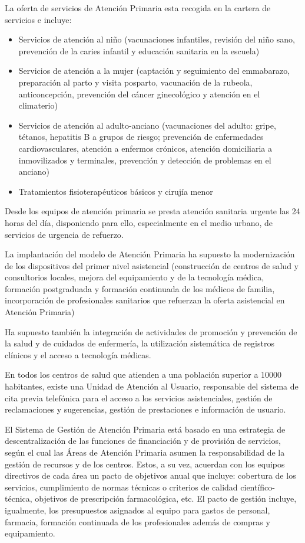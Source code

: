 La oferta de servicios de Atención Primaria esta recogida en la cartera de servicios e incluye:

\begin{itemize}
    \item Servicios de atención al niño (vacunaciones infantiles, revisión del niño sano, prevención de la caries infantil y educación sanitaria en la escuela)
    \item Servicios de atención a la mujer (captación y seguimiento del emmabarazo, preparación al parto y visita posparto, vacunación de la rubeola, anticoncepción, prevención del cáncer ginecológico y atención en el climaterio)
    \item Servicios de atención al adulto-anciano (vacunaciones del adulto: gripe, tétanos, hepatitis B a grupos de riesgo; prevención de enfermedades cardiovasculares, atención a enfermos crónicos, atención domiciliaria a inmovilizados y terminales, prevención y detección de problemas en el anciano)
    \item Tratamientos fisioterapéuticos básicos y cirujía menor
\end{itemize}

Desde los equipos de atención primaria se presta atención sanitaria urgente las 24 horas del día, disponiendo para ello, especialmente en el medio urbano, de servicios de urgencia de refuerzo.

La implantación del modelo de Atención Primaria ha supuesto la modernización de los dispositivos del primer nivel asistencial (construcción de centros de salud y consultorios locales, mejora del equipamiento y de la tecnología médica, formación postgraduada y formación continuada de los médicos de familia, incorporación de profesionales sanitarios que refuerzan la oferta asistencial en Atención Primaria)

Ha supuesto también la integración de actividades de promoción y prevención de la salud y de cuidados de enfermería, la utilización sistemática de registros clínicos y el acceso a tecnología médicas.

En todos los centros de salud que atienden a una población superior a 10000 habitantes, existe una Unidad de Atención al Usuario, responsable del sistema de cita previa telefónica para el acceso a los servicios asistenciales, gestión de reclamaciones y sugerencias, gestión de prestaciones e información de usuario.

El Sistema de Gestión de Atención Primaria está basado en una estrategia de descentralización de las funciones de financiación y de provisión de servicios, según el cual las Áreas de Atención Primaria asumen la responsabilidad de la gestión de recursos y de los centros. Estos, a su vez, acuerdan con los equipos directivos de cada área un pacto de objetivos anual que incluye: cobertura de los servicios, cumplimiento de normas técnicas o criterios de calidad científico-técnica, objetivos de prescripción farmacológica, etc. El pacto de gestión incluye, igualmente, los presupuestos asignados al equipo para gastos de personal, farmacia, formación continuada de los profesionales además de compras y equipamiento.
